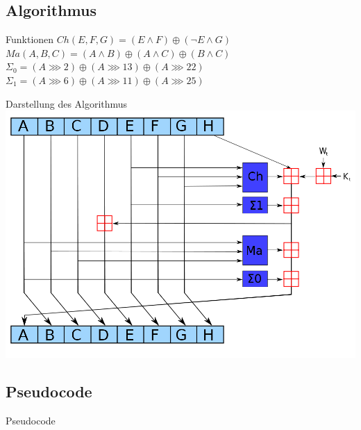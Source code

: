 \documentclass[xcolor=x11names,compress]{beamer}
\renewcommand{\(}{\begin{columns}}
\renewcommand{\)}{\end{columns}}
\newcommand{\<}[1]{\begin{column}{#1}}
\renewcommand{\>}{\end{column}}
\begin{document}
\subsection{Algorithmus}
\begin{frame}{Funktionen}
$ Ch(E,F,G) = (E\wedge F) \oplus (\neg E\wedge G)$
$ Ma(A,B,C) = (A\wedge B) \oplus (A\wedge C) \oplus (B\wedge C)$\\
$ \Sigma_0 = (A\ggg 2) \oplus (A\ggg 13) \oplus (A\ggg 22) $\\
$ \Sigma_1 = (A\ggg 6) \oplus (A\ggg 11) \oplus (A\ggg 25) $\\
\end{frame}


\begin{frame}{Darstellung des Algorithmus}
\includegraphics[scale=0.3]{sha256.png}\\
\end{frame}


\subsection{Pseudocode}
\begin{frame}{Pseudocode}

\end{frame}

\end{document}
